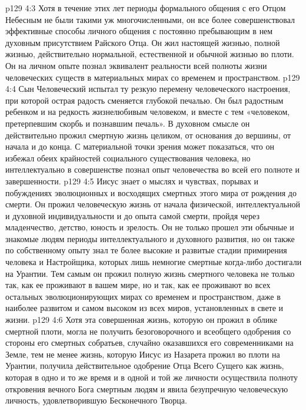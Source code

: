 \vs p129 4:3 Хотя в течение этих лет периоды формального общения с его Отцом Небесным не были такими уж многочисленными, он все более совершенствовал эффективные способы личного общения с постоянно пребывающим в нем духовным присутствием Райского Отца. Он жил настоящей жизнью, полной жизнью, действительно нормальной, естественной и обычной жизнью во плоти. Он на личном опыте познал эквивалент реальности всей полноты жизни человеческих существ в материальных мирах со временем и пространством.
\vs p129 4:4 Сын Человеческий испытал ту резкую перемену человеческого настроения, при которой острая радость сменяется глубокой печалью. Он был радостным ребенком и на редкость жизнелюбивым человеком, и вместе с тем «человеком, претерпевшим скорбь и познавшим печаль». В духовном смысле он действительно прожил смертную жизнь целиком, от основания до вершины, от начала и до конца. С материальной точки зрения может показаться, что он избежал обеих крайностей социального существования человека, но интеллектуально в совершенстве познал опыт человечества во всей его полноте и завершенности.
\vs p129 4:5 Иисус знает о мыслях и чувствах, порывах и побуждениях эволюционных и восходящих смертных этого мира от рождения до смерти. Он прожил человеческую жизнь от начала физической, интеллектуальной и духовной индивидуальности и до опыта самой смерти, пройдя через младенчество, детство, юность и зрелость. Он не только прошел эти обычные и знакомые людям периоды интеллектуального и духовного развития, но он также по собственному опыту знал те более высокие и развитые стадии примирения человека и Настройщика, которых лишь немногие смертные когда\hyp{}либо достигали на Урантии. Тем самым он прожил полную жизнь смертного человека не только так, как ее проживают в вашем мире, но и так, как ее проживают во всех остальных эволюционирующих мирах со временем и пространством, даже в наиболее развитом и самом высоком из всех миров, установленных в свете и жизни.
\vs p129 4:6 Хотя эта совершенная жизнь, которую он прожил в облике смертной плоти, могла не получить безоговорочного и всеобщего одобрения со стороны его смертных собратьев, случайно оказавшихся его современниками на Земле, тем не менее жизнь, которую Иисус из Назарета прожил во плоти на Урантии, получила действительное одобрение Отца Всего Сущего как жизнь, которая в одно и то же время и в одной и той же личности осуществила полноту откровения вечного Бога смертным людям и явила безупречную человеческую личность, удовлетворившую Бесконечного Творца.
